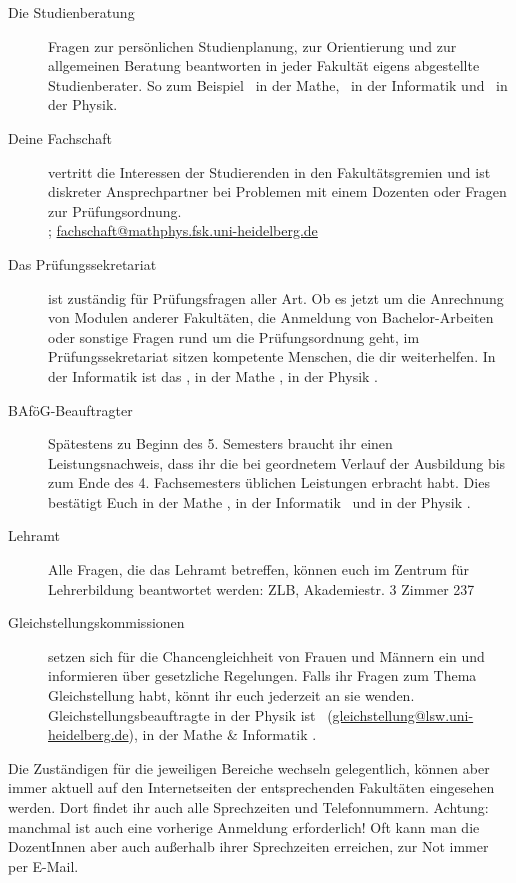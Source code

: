 \begin{description}
\item[Die Studienberatung] Fragen zur persönlichen Studienplanung, zur
	Orientierung und zur allgemeinen Beratung beantworten in jeder Fakultät
	eigens abgestellte Studienberater. So zum Beispiel \studienberatungmathe\
	in der Mathe, \studienberatunginformatik\ in der Informatik und
	\studienberatungphysik\ in der Physik.

\item[Deine Fachschaft] vertritt die Interessen der Studierenden in den
	Fakultätsgremien und ist diskreter Ansprechpartner bei Problemen mit einem
	Dozenten oder Fragen zur Prüfungsordnung. \\\fsraum;
	\url{fachschaft@mathphys.fsk.uni-heidelberg.de}

\item[Das Prüfungssekretariat] ist zuständig für Prüfungsfragen aller Art. Ob
	es jetzt um die Anrechnung von Modulen anderer Fakultäten, die Anmeldung
	von Bachelor-Arbeiten oder sonstige Fragen rund um die Prüfungsordnung
	geht, im Prüfungssekretariat sitzen kompetente Menschen, die dir
	weiterhelfen. In der Informatik ist das \pruefsekinfo, in der Mathe
	\pruefsekmathe, in der Physik \pruefsekphysik.

\item[BAföG-Beauftragter] Spätestens zu Beginn des 5. Semesters braucht ihr
	einen Leistungsnachweis, dass ihr die bei geordnetem Verlauf der Ausbildung
	bis zum Ende des 4. Fachsemesters üblichen Leistungen erbracht habt. Dies
	bestätigt Euch in der Mathe \bafogmathe , in der Informatik
	\bafoginformatik\ und in der Physik \bafogphysik .

\item[Lehramt] Alle Fragen, die das Lehramt betreffen, können euch im Zentrum
	für Lehrerbildung beantwortet werden: ZLB, Akademiestr. 3 Zimmer 237

\item[Gleichstellungskommissionen] setzen sich für die Chancengleichheit von
	Frauen und Männern ein und informieren über gesetzliche Regelungen. Falls
	ihr Fragen zum Thema Gleichstellung habt, könnt ihr euch jederzeit an sie
	wenden. Gleichstellungsbeauftragte in der Physik ist
	\frauenbeauftragtephysik\ (\url{gleichstellung@lsw.uni-heidelberg.de}), in
	der Mathe \& Informatik \frauenbeauftragtemathe .


\end{description}


\noindent Die Zuständigen für die jeweiligen Bereiche wechseln gelegentlich, können aber immer
aktuell auf den Internetseiten der entsprechenden Fakultäten eingesehen werden. Dort
findet ihr auch alle Sprechzeiten und Telefonnummern. Achtung: manchmal ist auch
eine vorherige Anmeldung erforderlich! Oft kann man die DozentInnen aber auch
außerhalb ihrer Sprechzeiten erreichen, zur Not immer per E-Mail.\\[.9cm]

